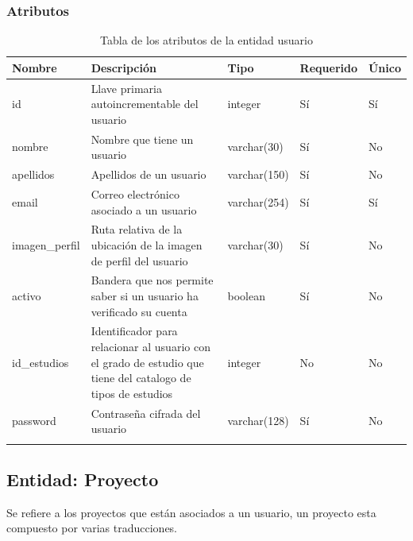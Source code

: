 \subsubsection{Atributos}
\begin{center}
	\begin{longtable}{|J{3cm}|J{4cm}|J{3cm}|J{2cm}|J{2cm}|}
		\hline
		\textbf{Nombre} & \textbf{Descripción} & \textbf{Tipo} & \textbf{Requerido} & \textbf{Único} \\ \hline
		id & Llave primaria autoincrementable del usuario & integer & Sí & Sí\\ \hline
		nombre & Nombre que tiene un usuario & varchar(30) & Sí & No \\ \hline
		apellidos & Apellidos de un usuario & varchar(150) & Sí & No \\ \hline
		email & Correo electrónico asociado a un usuario & varchar(254) & Sí & Sí\\ \hline
		imagen\_perfil & Ruta relativa de la ubicación de la imagen de perfil del usuario & varchar(30) & Sí & No \\ \hline
		activo & Bandera que nos permite saber si un usuario ha verificado su cuenta & boolean & Sí & No \\ \hline
		id\_estudios & Identificador para relacionar al usuario con el grado de estudio que tiene del catalogo de tipos de estudios & integer & No & No \\ \hline
		password & Contraseña cifrada del usuario & varchar(128) & Sí & No \\ \hline
		\caption{Tabla de los atributos de la entidad usuario}
		\label{tbl:entidad-usuario}
	\end{longtable}
\end{center}
\subsection{Entidad: Proyecto}
Se refiere a los proyectos que están asociados a un usuario, un proyecto esta compuesto por varias traducciones.
